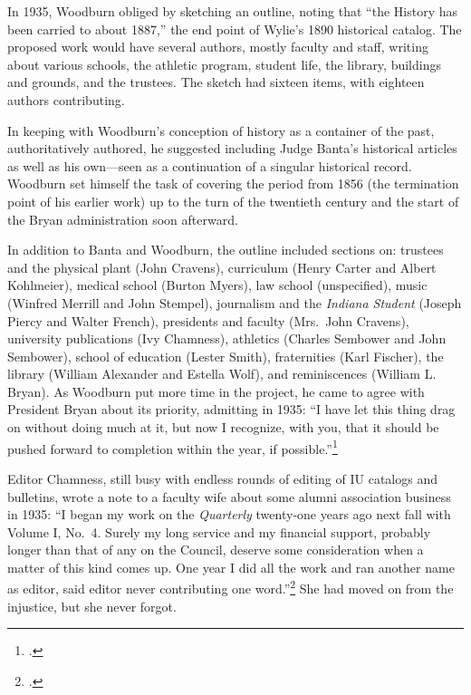 \documentclass[
  american,
  letterpaper,
]{scrreprt}
\begin{document}
In 1935, Woodburn obliged by sketching an outline, noting that ``the
History has been carried to about 1887,'' the end point of Wylie's 1890
historical catalog. The proposed work would have several authors, mostly
faculty and staff, writing about various schools, the athletic program,
student life, the library, buildings and grounds, and the trustees. The
sketch had sixteen items, with eighteen authors contributing.

In keeping with Woodburn's conception of history as a container of the
past, authoritatively authored, he suggested including Judge Banta's
historical articles as well as his own---seen as a continuation of a
singular historical record. Woodburn set himself the task of covering
the period from 1856 (the termination point of his earlier work) up to
the turn of the twentieth century and the start of the Bryan
administration soon afterward.

In addition to Banta and Woodburn, the outline included sections on:
trustees and the physical plant (John Cravens), curriculum (Henry Carter
and Albert Kohlmeier), medical school (Burton Myers), law school
(unspecified), music (Winfred Merrill and John Stempel), journalism and
the \emph{Indiana Student} (Joseph Piercy and Walter French), presidents
and faculty (Mrs.~John Cravens), university publications (Ivy Chamness),
athletics (Charles Sembower and John Sembower), school of education
(Lester Smith), fraternities (Karl Fischer), the library (William
Alexander and Estella Wolf), and reminiscences (William L. Bryan). As
Woodburn put more time in the project, he came to agree with President
Bryan about its priority, admitting in 1935: ``I have let this thing
drag on without doing much at it, but now I recognize, with you, that it
should be pushed forward to completion within the year, if
possible.''\footnote{.}

Editor Chamness, still busy with endless rounds of editing of IU
catalogs and bulletins, wrote a note to a faculty wife about some alumni
association business in 1935: ``I began my work on the \emph{Quarterly}
twenty-one years ago next fall with Volume I, No.~4. Surely my long
service and my financial support, probably longer than that of any on
the Council, deserve some consideration when a matter of this kind comes
up. One year I did all the work and ran another name as editor, said
editor never contributing one word.''\footnote{.} She had moved on
from the injustice, but she never forgot.
\end{document}
